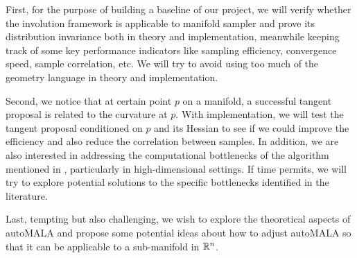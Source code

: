 \documentclass{article}
\begin{document}
First, for the purpose of building a baseline of our project, we will verify whether the involution framework is applicable to manifold sampler and prove its distribution invariance both in theory and implementation, meanwhile keeping track of some key performance indicators like sampling efficiency, convergence speed, sample correlation, etc. We will try to avoid using too much of the geometry language in theory and implementation.

Second, we notice that at certain point $p$ on a manifold, a successful tangent proposal is related to the curvature at $p$. With implementation, we will test the tangent proposal conditioned on $p$ and its Hessian to see if we could improve the efficiency and also reduce the correlation between samples. In addition, we are also interested in addressing the computational bottlenecks of the algorithm mentioned in \cite{manifoldchild}, particularly in high-dimensional settings. If time permits, we will try to explore potential solutions to the specific bottlenecks identified in the literature.

Last, tempting but also challenging, we wish to explore the theoretical aspects of autoMALA and propose some potential ideas about how to adjust autoMALA so that it can be applicable to a sub-manifold in $\mathbb R^n$.




\nocite{*}



\clearpage

 
\end{document}
